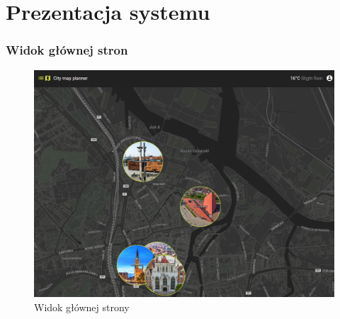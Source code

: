 
\chapter{Prezentacja systemu}
\label{ch:prezentacja-systemu}



\subsection{Widok głównej stron}
\label{sec:mapawidok}
\begin{figure}[H]
    \centering
    \includegraphics[width=1\textwidth]{attachments/mapawidok}
    \caption{Widok głównej strony}
    \label{fig:mapawidok}
    \end{figure}

